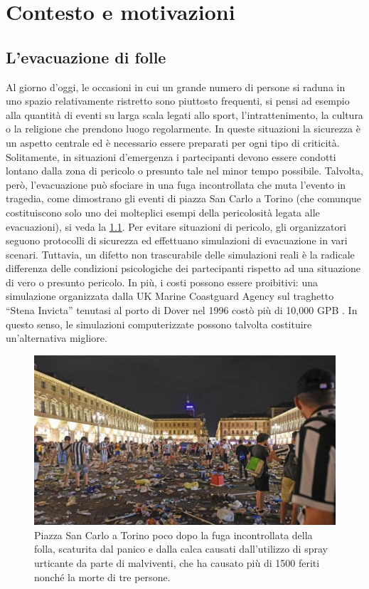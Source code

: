 \documentclass[12pt,a4paper,openright,oneside]{book}
\begin{document}
\mainmatter

\chapter{Contesto e motivazioni}
\label{chap:background}

\section{L'evacuazione di folle}
Al giorno d’oggi, le occasioni in cui un grande numero di persone si raduna in uno spazio relativamente ristretto sono piuttosto frequenti, si pensi ad esempio alla quantità di eventi su larga scala legati allo sport, l’intrattenimento, la cultura o la religione che prendono luogo regolarmente. In queste situazioni la sicurezza è un aspetto centrale ed è necessario essere preparati per ogni tipo di criticità. Solitamente, in situazioni d’emergenza i partecipanti devono essere condotti lontano dalla zona di pericolo o presunto tale nel minor tempo possibile. Talvolta, però, l’evacuazione può sfociare in una fuga incontrollata che muta l’evento in tragedia, come dimostrano gli eventi di piazza San Carlo a Torino (che comunque costituiscono solo uno dei molteplici esempi della pericolosità legata alle evacuazioni), si veda la \cref{fig:piazza-san-carlo}. Per evitare situazioni di pericolo, gli organizzatori seguono protocolli di sicurezza ed effettuano simulazioni di evacuazione in vari scenari. Tuttavia, un difetto non trascurabile delle simulazioni reali è la radicale differenza delle condizioni psicologiche dei partecipanti rispetto ad una situazione di vero o presunto pericolo. In più, i costi possono essere proibitivi: una simulazione organizzata dalla UK Marine Coastguard Agency sul traghetto “Stena Invicta” tenutasi al porto di Dover nel 1996 costò più di 10,000 GPB \cite{MSAEvacuationSimulation}. In questo senso, le simulazioni computerizzate possono talvolta costituire un’alternativa migliore.
\begin{figure}
	\centering
	\includegraphics[width=0.8\linewidth]{figures/piazza-san-carlo.jpeg}
	\caption{Piazza San Carlo a Torino poco dopo la fuga incontrollata della folla, scaturita dal panico e dalla calca causati dall'utilizzo di spray urticante da parte di malviventi, che ha causato più di 1500 feriti nonché la morte di tre persone.}
	\label{fig:piazza-san-carlo}
\end{figure}
\end{document}
